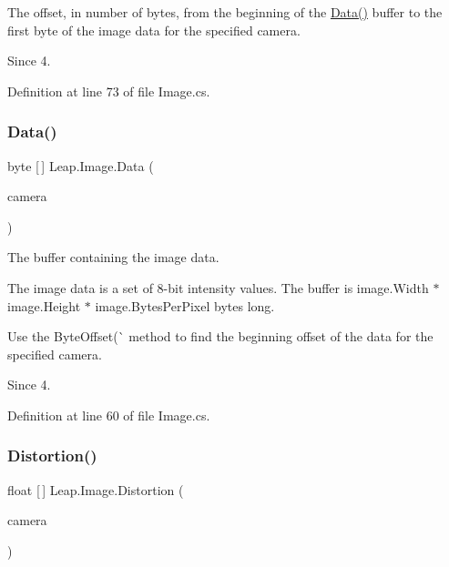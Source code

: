 The offset, in number of bytes, from the beginning of the \mbox{\hyperlink{class_leap_1_1_image_a13a2744f47a3bb324d08dca19d971f17}{Data()}} buffer to the first byte of the image data for the specified camera. 

\begin{DoxySince}{Since}
4. 
\end{DoxySince}


Definition at line 73 of file Image.\+cs.

\mbox{\label{class_leap_1_1_image_a13a2744f47a3bb324d08dca19d971f17}} 
\subsubsection{\texorpdfstring{Data()}{Data()}}
{\footnotesize\ttfamily byte \mbox{[}$\,$\mbox{]} Leap.\+Image.\+Data (\begin{DoxyParamCaption}\item[{\mbox{\hyperlink{class_leap_1_1_image_a28310e43e0f2d7f7117e1b45330bdc38}{Camera\+Type}}}]{camera }\end{DoxyParamCaption})}



The buffer containing the image data. 

The image data is a set of 8-\/bit intensity values. The buffer is image.\+Width $\ast$ image.\+Height $\ast$ image.\+Bytes\+Per\+Pixel bytes long.

Use the Byte\+Offset(\`{} method to find the beginning offset of the data for the specified camera.

\begin{DoxySince}{Since}
4. 
\end{DoxySince}


Definition at line 60 of file Image.\+cs.

\mbox{\label{class_leap_1_1_image_a5bf2883749b04f3e5644fc68a418add4}} 
\subsubsection{\texorpdfstring{Distortion()}{Distortion()}}
{\footnotesize\ttfamily float \mbox{[}$\,$\mbox{]} Leap.\+Image.\+Distortion (\begin{DoxyParamCaption}\item[{\mbox{\hyperlink{class_leap_1_1_image_a28310e43e0f2d7f7117e1b45330bdc38}{Camera\+Type}}}]{camera }\end{DoxyParamCaption})}



